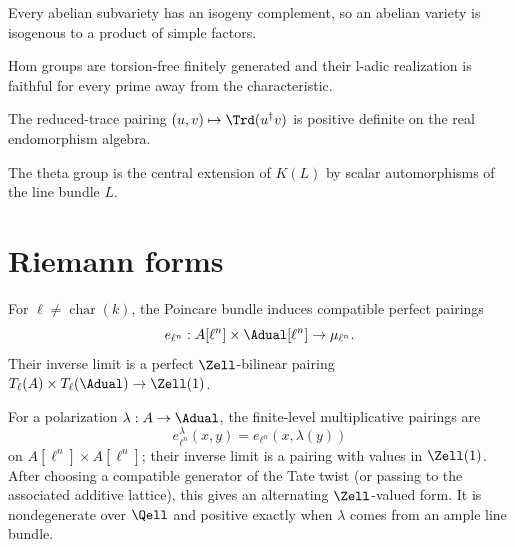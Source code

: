 \begin{remark}
\label{mumford-iv19-poincare-complete-reducibility}
Every abelian subvariety has an isogeny complement, so an abelian variety is
isogenous to a product of simple factors.
\notready
\end{remark}

\begin{remark}
\label{mumford-iv19-hom-finite-generation-injectivity}
Hom groups are torsion-free finitely generated and their l-adic realization is
faithful for every prime away from the characteristic.
\notready
\end{remark}

\begin{remark}
\label{mumford-iv21-rosati-positive-trace}
The reduced-trace pairing $(u,v)\mapsto\Trd(u^\dagger v)$ is positive
definite on the real endomorphism algebra.
\notready
\end{remark}

\begin{remark}
\label{mumford-iv23-theta-group-definition}
The theta group is the central extension of $K(L)$ by scalar automorphisms of
the line bundle $L$.
\notready
\end{remark}

\section{Riemann forms}
\label{mumford-IV20}

\begin{definition}
\label{mumford-def-weil-pairing-ladic}
For $\ell\ne\operatorname{char}(k)$, the Poincare bundle induces compatible
perfect pairings
\[
 e_{\ell^n}:A[\ell^n]\times\Adual[\ell^n]\to\mu_{\ell^n}.
\]
Their inverse limit is a perfect $\Zell$-bilinear pairing
$T_\ell(A)\times T_\ell(\Adual)\to\Zell(1)$.
\notready
\end{definition}

\begin{definition}
\label{mumford-def-riemann-form-algebraic}
For a polarization $\lambda:A\to\Adual$, the finite-level multiplicative
pairings are
\[
 e_{\ell^n}^{\lambda}(x,y)=e_{\ell^n}(x,\lambda(y))
\]
on $A[\ell^n]\times A[\ell^n]$; their inverse limit is a pairing with values
in $\Zell(1)$.  After choosing a compatible generator of the Tate twist (or
passing to the associated additive lattice), this gives an alternating
$\Zell$-valued form.  It is nondegenerate over $\Qell$ and positive exactly
when $\lambda$ comes from an ample line bundle.
\notready
\end{definition}


